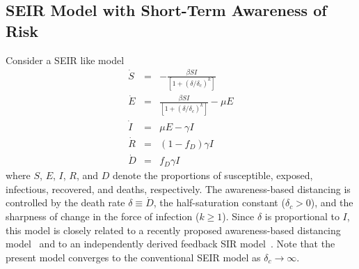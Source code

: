 \subsection{SEIR Model with Short-Term Awareness of Risk}
Consider a SEIR like model
\begin{eqnarray}
\dot{S} &=& -\frac{\beta SI}{\left[1+\left(\delta/\delta_c\right)^{k}\right]}\\
\dot{E} &=& \frac{\beta SI}{\left[1+\left(\delta/\delta_c\right)^{k}\right]}-\mu E\\
\dot{I} &=& \mu E-\gamma I \\
\dot{R} &=& (1-f_D)\gamma I\\
\dot{D} &=& f_D\gamma I
\end{eqnarray}
where $S$, $E$, $I$, $R$, and $D$ denote the proportions of
susceptible, exposed, infectious, recovered, and deaths, respectively.
The awareness-based distancing is controlled by 
the death rate $\delta\equiv \dot{D}$,
the half-saturation constant ($\delta_c>0$), and
the sharpness of change in the force of infection ($k\geq 1$).
Since $\delta$ is proportional to $I$, this model is closely related to a recently proposed awareness-based distancing model~\citep{eksin2019systematic}
and to an independently derived feedback SIR model~\citep{franco2020feedback}.
Note that the present
model converges to the conventional SEIR model as $\delta_c\rightarrow \infty$.
